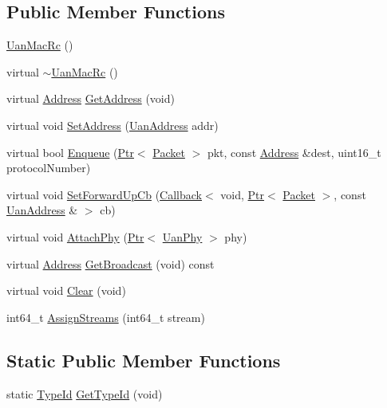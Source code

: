 \subsection*{Public Member Functions}
\begin{DoxyCompactItemize}
\item 
\hyperlink{classns3_1_1UanMacRc_a6bcb003c0445dcd59276dd4ae0c2dafd}{Uan\+Mac\+Rc} ()
\item 
virtual \hyperlink{classns3_1_1UanMacRc_aa9ad8205eae28c8a688c4d87a8601586}{$\sim$\+Uan\+Mac\+Rc} ()
\item 
virtual \hyperlink{classns3_1_1Address}{Address} \hyperlink{classns3_1_1UanMacRc_a31648a747e947870f4ec77015cd31c46}{Get\+Address} (void)
\item 
virtual void \hyperlink{classns3_1_1UanMacRc_ad2195e1f1de0b2e8977bff88a6d2a0e2}{Set\+Address} (\hyperlink{classns3_1_1UanAddress}{Uan\+Address} addr)
\item 
virtual bool \hyperlink{classns3_1_1UanMacRc_a186aaab5a7b2881f87e14cfa0b6ed805}{Enqueue} (\hyperlink{classns3_1_1Ptr}{Ptr}$<$ \hyperlink{classns3_1_1Packet}{Packet} $>$ pkt, const \hyperlink{classns3_1_1Address}{Address} \&dest, uint16\+\_\+t protocol\+Number)
\item 
virtual void \hyperlink{classns3_1_1UanMacRc_a05ea5eb319bd8807e9accd6d224c7500}{Set\+Forward\+Up\+Cb} (\hyperlink{classns3_1_1Callback}{Callback}$<$ void, \hyperlink{classns3_1_1Ptr}{Ptr}$<$ \hyperlink{classns3_1_1Packet}{Packet} $>$, const \hyperlink{classns3_1_1UanAddress}{Uan\+Address} \& $>$ cb)
\item 
virtual void \hyperlink{classns3_1_1UanMacRc_a389dcb7e687df088a34ac894e8637482}{Attach\+Phy} (\hyperlink{classns3_1_1Ptr}{Ptr}$<$ \hyperlink{classns3_1_1UanPhy}{Uan\+Phy} $>$ phy)
\item 
virtual \hyperlink{classns3_1_1Address}{Address} \hyperlink{classns3_1_1UanMacRc_a3fe0154f749c28ea1749c6b52e515622}{Get\+Broadcast} (void) const 
\item 
virtual void \hyperlink{classns3_1_1UanMacRc_a21a528966d3a9d1902251bba116ec923}{Clear} (void)
\item 
int64\+\_\+t \hyperlink{classns3_1_1UanMacRc_a34ea1be023e505eca87199a53032ea9c}{Assign\+Streams} (int64\+\_\+t stream)
\end{DoxyCompactItemize}
\subsection*{Static Public Member Functions}
\begin{DoxyCompactItemize}
\item 
static \hyperlink{classns3_1_1TypeId}{Type\+Id} \hyperlink{classns3_1_1UanMacRc_aeb7e40a495e83b9d0bc64ccea9a896a5}{Get\+Type\+Id} (void)
\end{DoxyCompactItemize}
